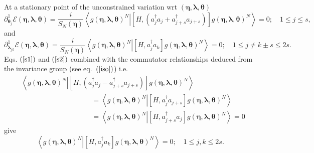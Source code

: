 \documentclass[aps,preprint]{revtex4}%
\begin{document}
At a stationary point of the unconstrained variation wrt $\left(
\bm{\eta},\bm{\lambda},\bm{\theta}\right)  $
\begin{equation}
\partial_{\bm{\theta}_{j}}^{1}\mathcal{E}\left(
\bm{\eta },\bm{\lambda},\bm{\theta}\right)  =\frac{i}{S_{N}\left(
\bm{\eta}\right)  }\left\langle \left.  g\left(
\bm{\eta },\bm{\lambda},\bm{\theta}\right)  ^{N}\right\vert \left[  H,\left(
a_{j}^{\dagger}a_{j}+a_{j+s}^{\dagger}a_{j+s}\right)  \right]  g\left(
\bm{\eta},\bm{\lambda},\bm{\theta}\right)  ^{N}\right\rangle =0;\quad1\leq
j\leq s, \label{s1}%
\end{equation}
and%
\begin{equation}
\partial_{\bm{\lambda}_{jk}}^{1}\mathcal{E}\left(
\bm{\eta },\bm{\lambda},\bm{\theta}\right)  =\frac{i}{S_{N}\left(
\bm{\eta}\right)  }\left\langle \left.  g\left(
\bm{\eta },\bm{\lambda},\bm{\theta}\right)  ^{N}\right\vert \left[
H,a_{j}^{\dagger}a_{k}\right]  g\left(
\bm{\eta},\bm{\lambda },\bm{\theta}\right)  ^{N}\right\rangle =0;\quad1\leq
j\neq k\pm s\leq2s. \label{s2}%
\end{equation}
Eqs. $\left(  \ref{s1}\right)  $ and $\left(  \ref{s2}\right)  $ combined with
the commutator relationships deduced from the invariance group (see
eq.\ $\left(  \ref{iso}\right)  $) i.e.\
\begin{align}
&  \left\langle \left.  g\left(  \bm{\eta},\bm{\lambda},\bm{\theta }\right)
^{N}\right\vert \left[  H,\left(  a_{j}^{\dagger}a_{j}-a_{j+s}^{\dagger
}a_{j+s}\right)  \right]  g\left(  \bm{\eta },\bm{\lambda},\bm{\theta}\right)
^{N}\right\rangle \nonumber\\
&  \qquad\qquad\qquad\qquad\qquad\left.  =\right.  \left\langle \left.
g\left(  \bm{\eta},\bm{\lambda},\bm{\theta}\right)  ^{N}\right\vert \left[
H,a_{j}^{\dagger}a_{j+s}\right]  g\left(
\bm{\eta },\bm{\lambda},\bm{\theta}\right)  ^{N}\right\rangle \nonumber\\
&  \qquad\qquad\qquad\qquad\qquad\left.  =\right.  \left\langle \left.
g\left(  \bm{\eta},\bm{\lambda},\bm{\theta}\right)  ^{N}\right\vert \left[
H,a_{j+s}^{\dagger}a_{j}\right]  g\left(
\bm{\eta },\bm{\lambda},\bm{\theta}\right)  ^{N}\right\rangle \left.
=\right.  0
\end{align}
give
\begin{equation}
\left\langle \left.  g\left(  \bm{\eta},\bm{\lambda},\bm{\theta }\right)
^{N}\right\vert \left[  H,a_{j}^{\dagger}a_{k}\right]  g\left(
\bm{\eta},\bm{\lambda},\bm{\theta}\right)  ^{N}\right\rangle =0;\quad1\leq
j,k\leq2s. \label{s3}%
\end{equation}
\end{document}
